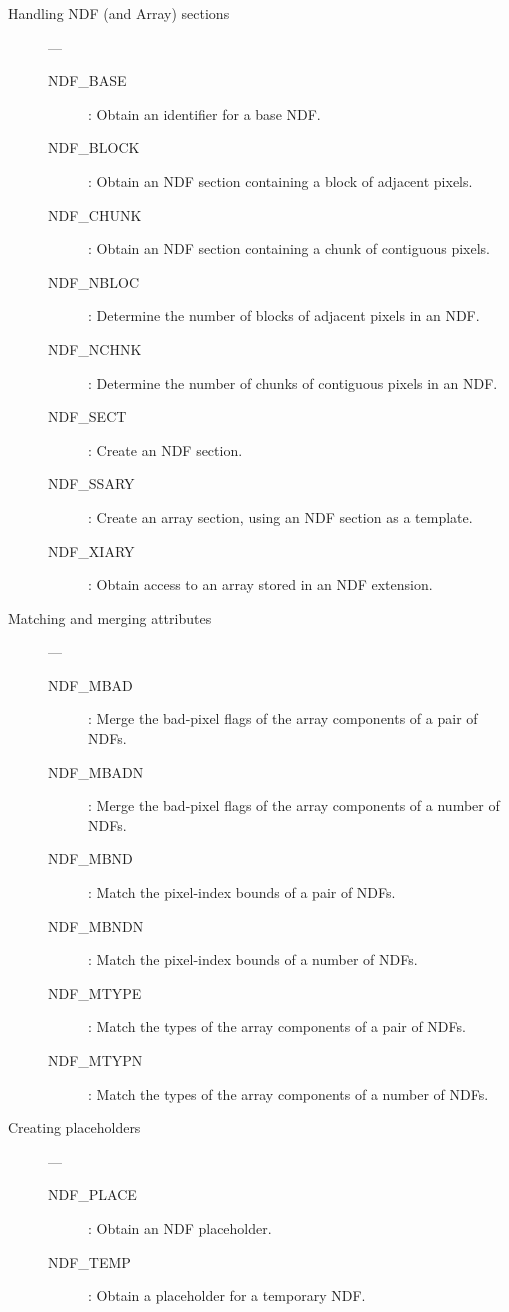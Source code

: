 \begin{description}
\item [Handling NDF (and Array) sections] ---

\begin{description}
\item [NDF\_BASE] : Obtain an identifier for a base NDF.
\item [NDF\_BLOCK] : Obtain an NDF section containing a block of adjacent pixels.
\item [NDF\_CHUNK] : Obtain an NDF section containing a chunk of contiguous pixels.
\item [NDF\_NBLOC] : Determine the number of blocks of adjacent pixels in an NDF.
\item [NDF\_NCHNK] : Determine the number of chunks of contiguous pixels in an NDF.
\item [NDF\_SECT] : Create an NDF section.
\item [NDF\_SSARY] : Create an array section, using an NDF section as a template.
\item [NDF\_XIARY] : Obtain access to an array stored in an NDF extension.
\end{description}

\item [Matching and merging attributes] ---

\begin{description}
\item [NDF\_MBAD] : Merge the bad-pixel flags of the array components of a pair of NDFs.
\item [NDF\_MBADN] : Merge the bad-pixel flags of the array components of a number of NDFs.
\item [NDF\_MBND] : Match the pixel-index bounds of a pair of NDFs.
\item [NDF\_MBNDN] : Match the pixel-index bounds of a number of NDFs.
\item [NDF\_MTYPE] : Match the types of the array components of a pair of NDFs.
\item [NDF\_MTYPN] : Match the types of the array components of a number of NDFs.
\end{description}

\item [Creating placeholders] ---

\begin{description}
\item [NDF\_PLACE] : Obtain an NDF placeholder.
\item [NDF\_TEMP] : Obtain a placeholder for a temporary NDF.
\end{description}


\end{description}
